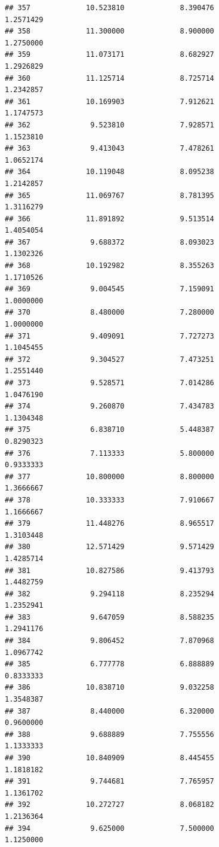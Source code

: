\documentclass[]{article}
\begin{document}
\begin{verbatim}
## 357             10.523810             8.390476               1.2571429
## 358             11.300000             8.900000               1.2750000
## 359             11.073171             8.682927               1.2926829
## 360             11.125714             8.725714               1.2342857
## 361             10.169903             7.912621               1.1747573
## 362              9.523810             7.928571               1.1523810
## 363              9.413043             7.478261               1.0652174
## 364             10.119048             8.095238               1.2142857
## 365             11.069767             8.781395               1.3116279
## 366             11.891892             9.513514               1.4054054
## 367              9.688372             8.093023               1.1302326
## 368             10.192982             8.355263               1.1710526
## 369              9.004545             7.159091               1.0000000
## 370              8.480000             7.280000               1.0000000
## 371              9.409091             7.727273               1.1045455
## 372              9.304527             7.473251               1.2551440
## 373              9.528571             7.014286               1.0476190
## 374              9.260870             7.434783               1.1304348
## 375              6.838710             5.448387               0.8290323
## 376              7.113333             5.800000               0.9333333
## 377             10.800000             8.800000               1.3666667
## 378             10.333333             7.910667               1.1666667
## 379             11.448276             8.965517               1.3103448
## 380             12.571429             9.571429               1.4285714
## 381             10.827586             9.413793               1.4482759
## 382              9.294118             8.235294               1.2352941
## 383              9.647059             8.588235               1.2941176
## 384              9.806452             7.870968               1.0967742
## 385              6.777778             6.888889               0.8333333
## 386             10.838710             9.032258               1.3548387
## 387              8.440000             6.320000               0.9600000
## 388              9.688889             7.755556               1.1333333
## 390             10.840909             8.445455               1.1818182
## 391              9.744681             7.765957               1.1361702
## 392             10.272727             8.068182               1.2136364
## 394              9.625000             7.500000               1.1250000

\end{verbatim}
\end{document}
